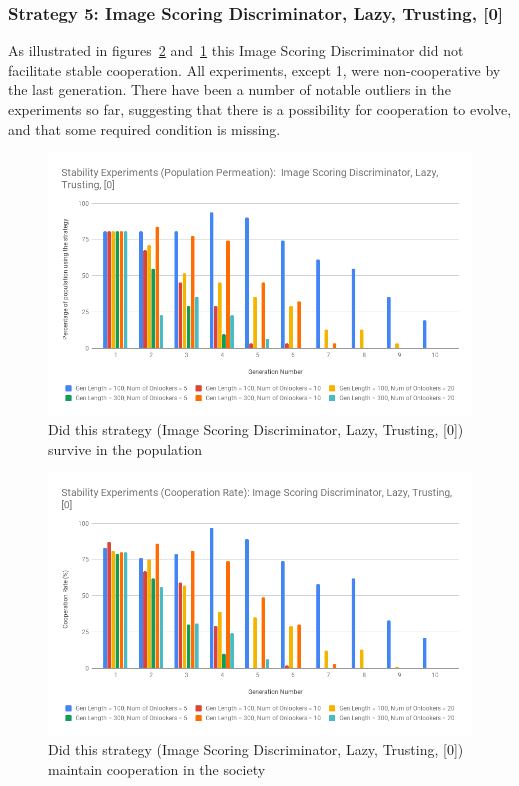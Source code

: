 \documentclass[]{final_report}
\begin{document}
\subsubsection{Strategy 5: Image Scoring Discriminator, Lazy, Trusting, [0]} 
As illustrated in figures~\ref{fig:isdlt0Coop} and~\ref{fig:isdlt0Pop} this Image Scoring Discriminator did not facilitate stable cooperation. All experiments, except 1, were non-cooperative by the last generation. There have been a number of notable outliers in the experiments so far, suggesting that there is a possibility for cooperation to evolve, and that some required condition is missing.
\begin{figure}
\begin{framed}
	\includegraphics[width=\textwidth]{isdlt0Pop.png}
	\caption{Did this strategy (Image Scoring Discriminator, Lazy, Trusting, [0]) survive in the population}
	\label{fig:isdlt0Pop}
\end{framed}
\end{figure}
\begin{figure}
\begin{framed}
	\includegraphics[width=\textwidth]{isdlt0Coop.png}
	\caption{Did this strategy (Image Scoring Discriminator, Lazy, Trusting, [0]) maintain cooperation in the society}
	\label{fig:isdlt0Coop}
\end{framed}
\end{figure}
\end{document}
